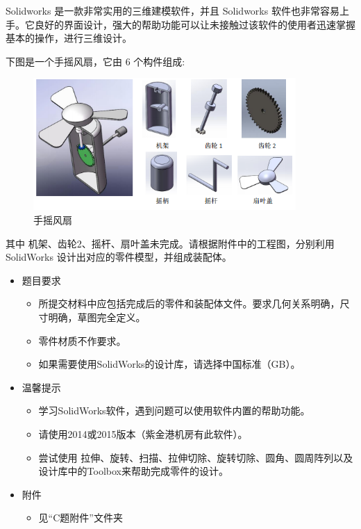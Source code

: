 \documentclass[12pt,a4paper]{article}
\begin{document}
\begin{ACEEproblem}{1.05}{\xiaosihao}{\youyuan}
Solidworks 是一款非常实用的三维建模软件，并且 Solidworks 软件也非常容易上手。它良好的界面设计，强大的帮助功能可以让未接触过该软件的使用者迅速掌握基本的操作，进行三维设计。\par
下图是一个手摇风扇，它由 6 个构件组成:\par
\begin{figure}[H]
\small
\centering
\includegraphics[width=10cm]{fig4.png}
\caption{手摇风扇} 
\end{figure} 
其中 机架、齿轮2、摇杆、扇叶盖未完成。请根据附件中的工程图，分别利用 SolidWorks 设计出对应的零件模型，并组成装配体。\par
\begin{itemize}
	\item 题目要求
	\begin{itemize}
		\item[1.] 所提交材料中应包括完成后的零件和装配体文件。要求几何关系明确，尺寸明确，草图完全定义。
		\item[2.] 零件材质不作要求。
		\item[3.] 如果需要使用SolidWorks的设计库，请选择中国标准（GB）。
	\end{itemize}
	\item 温馨提示
	\begin{itemize}
		\item[1.] 学习SolidWorks软件，遇到问题可以使用软件内置的帮助功能。
		\item[2.] 请使用2014或2015版本（紫金港机房有此软件）。
		\item[3.] 尝试使用 拉伸、旋转、扫描、拉伸切除、旋转切除、圆角、圆周阵列以及设计库中的Toolbox来帮助完成零件的设计。
	\end{itemize}
	\item 附件
	\begin{itemize}
		\item[] 见``C题附件''文件夹
	\end{itemize}
\end{itemize}
\end{ACEEproblem}
\end{document}
